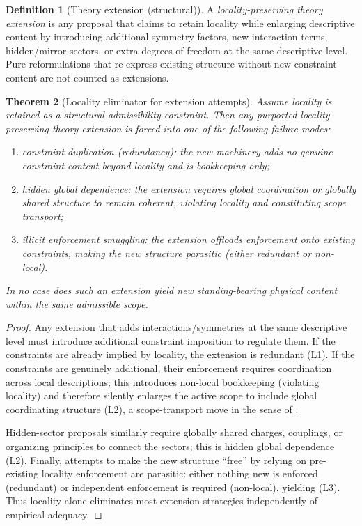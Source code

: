 \documentclass[11pt]{article}
\newtheorem{theorem}{Theorem}[section]
\theoremstyle{definition}
\newtheorem{definition}[theorem]{Definition}
\begin{document}
\begin{definition}[Theory extension (structural)]
A \emph{locality-preserving theory extension} is any proposal that claims to retain locality while enlarging descriptive content by introducing additional symmetry factors, new interaction terms, hidden/mirror sectors, or extra degrees of freedom at the same descriptive level.
Pure reformulations that re-express existing structure without new constraint content are not counted as extensions.
\end{definition}

\begin{theorem}[Locality eliminator for extension attempts]
\label{thm:locality-eliminator}
Assume locality is retained as a structural admissibility constraint.
Then any purported locality-preserving theory extension is forced into one of the following failure modes:
\begin{enumerate}[label=\textbf{(L\arabic*)}, leftmargin=2.6em]
\item \emph{constraint duplication (redundancy):} the new machinery adds no genuine constraint content beyond locality and is bookkeeping-only;
\item \emph{hidden global dependence:} the extension requires global coordination or globally shared structure to remain coherent, violating locality and constituting scope transport;
\item \emph{illicit enforcement smuggling:} the extension offloads enforcement onto existing constraints, making the new structure parasitic (either redundant or non-local).
\end{enumerate}
In no case does such an extension yield new standing-bearing physical content within the same admissible scope.
\end{theorem}

\begin{proof}
Any extension that adds interactions/symmetries at the same descriptive level must introduce additional constraint imposition to regulate them.
If the constraints are already implied by locality, the extension is redundant (L1).
If the constraints are genuinely additional, their enforcement requires coordination across local descriptions; this introduces non-local bookkeeping (violating locality) and therefore silently enlarges the active scope to include global coordinating structure (L2), a scope-transport move in the sense of .

Hidden-sector proposals similarly require globally shared charges, couplings, or organizing principles to connect the sectors; this is hidden global dependence (L2).
Finally, attempts to make the new structure ``free'' by relying on pre-existing locality enforcement are parasitic: either nothing new is enforced (redundant) or independent enforcement is required (non-local), yielding (L3).
Thus locality alone eliminates most extension strategies independently of empirical adequacy.
\end{proof}
\end{document}
